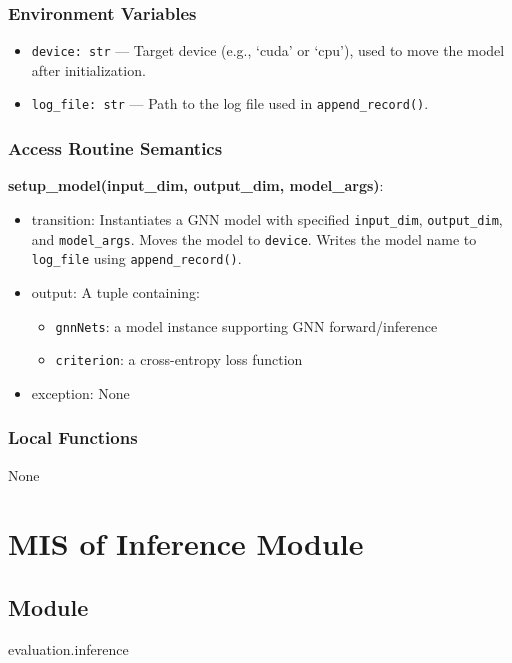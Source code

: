 \documentclass[12pt, titlepage]{article}
\begin{document}
\subsubsection{Environment Variables}
\begin{itemize}
  \item \texttt{device: str} — Target device (e.g., `cuda' or `cpu'), used to move the model after initialization.
  \item \texttt{log\_file: str} — Path to the log file used in \texttt{append\_record()}.
\end{itemize}

\subsubsection{Access Routine Semantics}

\noindent \textbf{setup\_model(input\_dim, output\_dim, model\_args)}:
\begin{itemize}
  \item transition: Instantiates a GNN model with specified \texttt{input\_dim}, \texttt{output\_dim}, and \texttt{model\_args}. Moves the model to \texttt{device}. Writes the model name to \texttt{log\_file} using \texttt{append\_record()}.
  \item output: A tuple containing:
  \begin{itemize}
    \item \texttt{gnnNets}: a model instance supporting GNN forward/inference
    \item \texttt{criterion}: a cross-entropy loss function
  \end{itemize}
  \item exception: None
\end{itemize}

\subsubsection{Local Functions}
None





\newpage








\section{MIS of Inference Module} \label{Test}

\subsection{Module}
evaluation.inference
\end{document}
